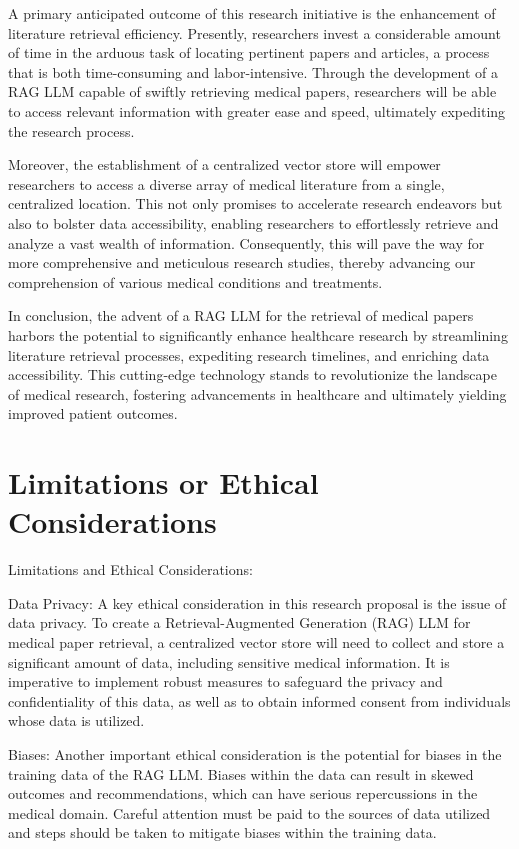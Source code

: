 \documentclass{article}
\begin{document}
A primary anticipated outcome of this research initiative is the enhancement of literature retrieval efficiency. Presently, researchers invest a considerable amount of time in the arduous task of locating pertinent papers and articles, a process that is both time-consuming and labor-intensive. Through the development of a RAG LLM capable of swiftly retrieving medical papers, researchers will be able to access relevant information with greater ease and speed, ultimately expediting the research process.

Moreover, the establishment of a centralized vector store will empower researchers to access a diverse array of medical literature from a single, centralized location. This not only promises to accelerate research endeavors but also to bolster data accessibility, enabling researchers to effortlessly retrieve and analyze a vast wealth of information. Consequently, this will pave the way for more comprehensive and meticulous research studies, thereby advancing our comprehension of various medical conditions and treatments.

In conclusion, the advent of a RAG LLM for the retrieval of medical papers harbors the potential to significantly enhance healthcare research by streamlining literature retrieval processes, expediting research timelines, and enriching data accessibility. This cutting-edge technology stands to revolutionize the landscape of medical research, fostering advancements in healthcare and ultimately yielding improved patient outcomes.

\section*{Limitations or Ethical Considerations}
Limitations and Ethical Considerations:

Data Privacy: A key ethical consideration in this research proposal is the issue of data privacy. To create a Retrieval-Augmented Generation (RAG) LLM for medical paper retrieval, a centralized vector store will need to collect and store a significant amount of data, including sensitive medical information. It is imperative to implement robust measures to safeguard the privacy and confidentiality of this data, as well as to obtain informed consent from individuals whose data is utilized.

Biases: Another important ethical consideration is the potential for biases in the training data of the RAG LLM. Biases within the data can result in skewed outcomes and recommendations, which can have serious repercussions in the medical domain. Careful attention must be paid to the sources of data utilized and steps should be taken to mitigate biases within the training data.
\end{document}
